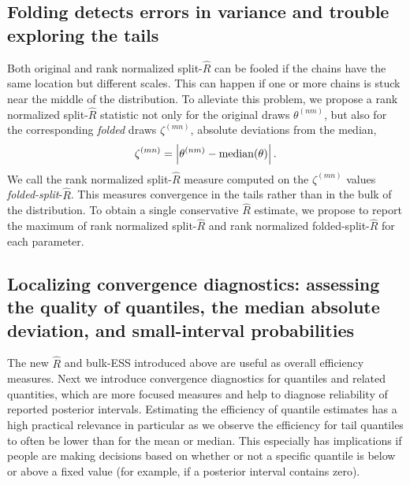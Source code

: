 \documentclass[american,]{article}
\theoremstyle{definition}
\begin{document}
\hypertarget{diagnostics-for-folded-draws}{%
\subsection{Folding detects errors in variance and trouble exploring the tails}\label{diagnostics-for-folded-draws}}


Both original and rank normalized split-\(\widehat{R}\) can be
fooled if the chains have the same location but different scales. This
can happen if one or more chains is stuck near the middle of the distribution. 
To alleviate this problem, we propose a
rank normalized split-\(\widehat{R}\) statistic not only for the
original draws \(\theta^{(nm)}\), but also for the corresponding {\em folded}
draws \(\zeta^{(mn)}\), absolute deviations from the median,
\begin{equation}
\label{zeta}
\zeta^{(mn)} = \left|\theta^{(nm)}-{\rm median}(\theta)\right|.
\end{equation}
We call the rank normalized split-\(\widehat{R}\) measure computed on the
 \(\zeta^{(mn)}\) values  \emph{folded-split}-\(\widehat{R}\).
  This measures convergence in the
tails rather than in the bulk of the distribution. To obtain a single
conservative \(\widehat{R}\) estimate, we propose to report the maximum
of rank normalized split-\(\widehat{R}\) and rank normalized
folded-split-\(\widehat{R}\) for each parameter.

\hypertarget{convergence-diagnostics-for-quantiles}{%
\subsection{Localizing convergence diagnostics: assessing the quality of quantiles, the median absolute deviation, and small-interval probabilities }\label{convergence-diagnostics-for-quantiles}}

The new \(\widehat{R}\) and bulk-ESS introduced above are useful as overall efficiency
measures. Next we introduce
convergence diagnostics for quantiles and related quantities, which are more focused measures and help to diagnose reliability of  reported
posterior intervals. Estimating
the efficiency of quantile estimates has a high practical
relevance in particular as we observe the efficiency for tail quantiles
to often be lower than for the mean or median.  This especially has implications
if people are making decisions based on whether or not a specific quantile
is below or above a fixed value (for example, if a posterior interval contains zero).
\end{document}
